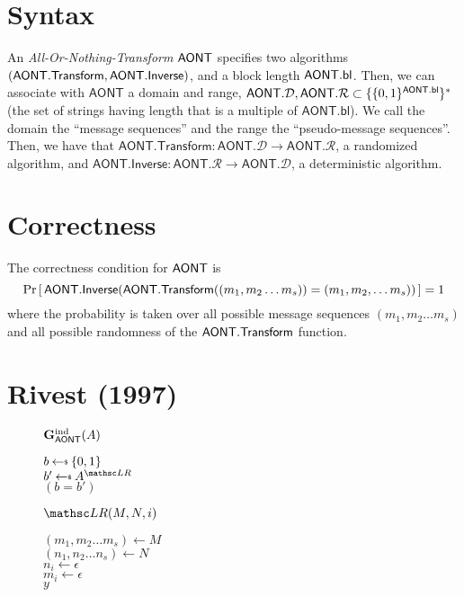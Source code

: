 \documentclass[11pt,twoside]{article}
\newcommand{\onlyinsubfile}[1]{#1}
\newcommand{\notinsubfile}[1]{}
\begin{document}
    \renewcommand{\onlyinsubfile}[1]{}
    \renewcommand{\notinsubfile}[1]{#1}
  
\section{Syntax}

An \emph{All-Or-Nothing-Transform} $\mathsf{AONT}$ specifies two algorithms $(\mathsf{AONT.Transform}, \mathsf{AONT.Inverse})$, and a block length $\mathsf{AONT.bl}$. Then, we can associate with $\mathsf{AONT}$ a domain and range, $\mathsf{AONT}.\mathcal{D}, \mathsf{AONT}.\mathcal{R}\subset \{\{0,1\}^{\mathsf{AONT.bl}}\}^*$(the set of strings having length that is a multiple of $\mathsf{AONT.bl}$). We call the domain the ``message sequences'' and the range the ``pseudo-message sequences''. Then, we have that $\mathsf{AONT.Transform}: \mathsf{AONT}.\mathcal{D}\rightarrow \mathsf{AONT}.\mathcal{R}$, a randomized algorithm, and  $\mathsf{AONT.Inverse}: \mathsf{AONT}.\mathcal{R}\rightarrow \mathsf{AONT}.\mathcal{D}$, a deterministic algorithm. 


\section{Correctness}
The correctness condition for $\mathsf{AONT}$ is $${\Pr\left[\,{\mathsf{AONT.Inverse}(\mathsf{AONT.Transform}((m_1,m_2\dots m_s))=(m_1,m_2,\dots m_s))}\,\right]} = 1$$ where the probability is taken over all possible message sequences $(m_1,m_2\dots m_s)$ and all possible randomness of the $\mathsf{AONT.Transform}$ function. 

\section{Rivest (1997)}

\begin{figure}[H]
{
\underline{$\mathbf{G}_{\mathsf{AONT}}^\text{ind}(A)$}

\begin{algorithm}[H]
$b \getsr \bits$\\
$b' \getsr \advA^{\LRO}$\\
\Return $(b=b')$
\end{algorithm}

\smallskip
\underline{$\LRO(M,N,i)$}

\begin{algorithm}[H]
$(m_1,m_2\dots m_s)\gets M$\\
$(n_1,n_2\dots n_s)\gets N$\\
$n_i\gets \epsilon$\\
$m_i\gets \epsilon$\\
\Return $y$
\end{algorithm}
}
\end{figure}
\end{document}
